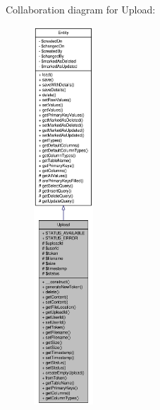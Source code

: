 Collaboration diagram for Upload:\nopagebreak
\begin{figure}[H]
\begin{center}
\leavevmode
\includegraphics[height=400pt]{classUpload__coll__graph}
\end{center}
\end{figure}
